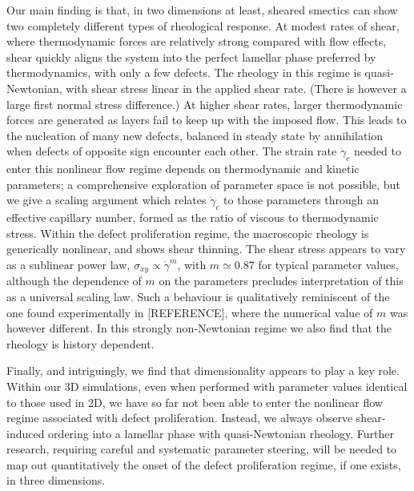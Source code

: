 \documentclass[8.5pt,twoside,twocolumn]{article}
\begin{document}
Our main finding is that, in two dimensions at least, sheared smectics can show two completely different types of rheological response. At modest rates
of shear, where thermodynamic forces are relatively strong compared with
flow effects,  shear quickly aligns the system into the perfect lamellar phase preferred by thermodynamics,
with only a few defects. The rheology in this regime is quasi-Newtonian, with shear stress linear in the applied shear rate. (There is however a large first normal stress difference.) At higher shear rates, larger thermodynamic forces are generated as layers fail to keep up with the imposed flow. This leads to the nucleation of many new defects, balanced in steady state by annihilation when defects of opposite sign encounter each other. The strain rate $\dot\gamma_c$ needed to enter this nonlinear flow regime depends on thermodynamic and kinetic parameters; a comprehensive exploration of parameter space is not possible, but we give a scaling argument which relates $\dot\gamma_c$ to those parameters through an effective capillary number, formed as the ratio of viscous to thermodynamic stress.
Within the defect proliferation regime, the macroscopic rheology is generically nonlinear, and shows shear thinning. The shear stress appears to vary as a sublinear power law, $\sigma_{xy}\propto\dot{\gamma}^m$, with $m\simeq 0.87$ for typical parameter values, although the dependence of $m$ on the parameters precludes interpretation of this as a universal scaling law.
Such a behaviour is qualitatively reminiscent of the one found experimentally in [REFERENCE], where the numerical value of $m$ was however different. In this strongly non-Newtonian regime we also find that the rheology is history dependent. 

Finally, and intriguingly, we find that dimensionality appears to play a key role. Within our 3D simulations, even when performed with parameter values identical to those used in 2D, we have so far not been able to enter the nonlinear flow regime associated with defect proliferation. Instead, we always observe shear-induced ordering into a lamellar phase with quasi-Newtonian rheology. Further research, requiring careful and systematic parameter steering, will be needed to map out quantitatively the onset of the defect proliferation regime, if one exists, in three dimensions.
 
\end{document}
